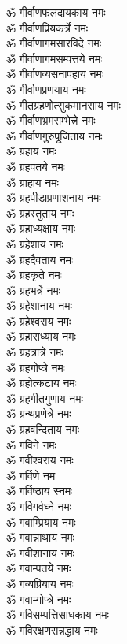 \begin{multicols}{2}
\begin{flushleft}
ॐ गीर्वाणफलदायकाय नमः\hfill{}\\
ॐ गीर्वाणप्रियकर्त्रे नमः\\
ॐ गीर्वाणागमसारविदे नमः\\
ॐ गीर्वाणागमसम्पत्तये नमः\\
ॐ गीर्वाणव्यसनापहाय  नमः\\
ॐ गीर्वाणप्रणयाय नमः\\
ॐ गीतग्रहणोत्सुकमानसाय नमः\\
ॐ गीर्वाणभ्रमसम्भेत्त्रे नमः\\
ॐ गीर्वाणगुरुपूजिताय नमः\\
ॐ ग्रहाय नमः\\
ॐ ग्रहपतये नमः\hfill{}\\
ॐ ग्राहाय नमः\\
ॐ ग्रहपीडाप्रणाशनाय नमः\\
ॐ ग्रहस्तुताय नमः\\
ॐ ग्रहाध्यक्षाय नमः\\
ॐ ग्रहेशाय नमः\\
ॐ ग्रहदैवताय नमः\\
ॐ ग्रहकृते नमः\\
ॐ ग्रहभर्त्रे नमः\\
ॐ ग्रहेशानाय नमः\\
ॐ ग्रहेश्वराय नमः\hfill{}\\
ॐ ग्रहाराध्याय नमः\\
ॐ ग्रहत्रात्रे नमः\\
ॐ ग्रहगोप्त्रे नमः\\
ॐ ग्रहोत्कटाय नमः\\
ॐ ग्रहगीतगुणाय नमः\\
ॐ ग्रन्थप्रणेत्रे नमः\\
ॐ ग्रहवन्दिताय नमः\\
ॐ गविने नमः\\
ॐ गवीश्वराय नमः\\
ॐ गर्विणे नमः\hfill{}\\
ॐ गर्विष्ठाय स्नमः\\
ॐ गर्विगर्वघ्ने नमः\\
ॐ गवाम्प्रियाय नमः\\
ॐ गवान्नाथाय नमः\\
ॐ गवीशानाय नमः\\
ॐ  गवाम्पतये नमः\\
ॐ गव्यप्रियाय नमः\\
ॐ गवाम्गोप्त्रे नमः\\
ॐ गविसम्पत्तिसाधकाय नमः\\
ॐ गविरक्षणसन्नद्धाय नमः\hfill{}\\

\end{flushleft}
\end{multicols}
